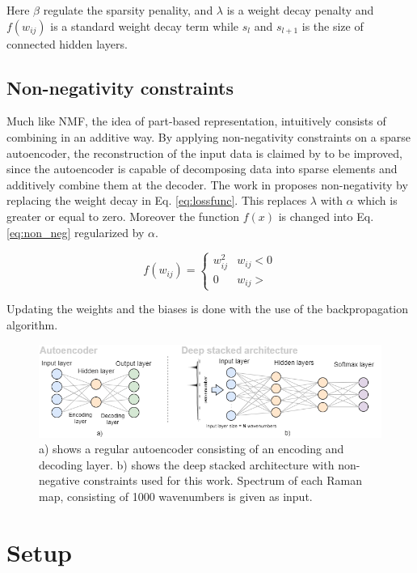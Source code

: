 \documentclass{article}
\begin{document}
Here $\beta$ regulate the sparsity penality, and $\lambda$ is a  weight decay penalty and $f(w_{ij})$ is a standard weight decay term while $s_l$ and $s_{l+1}$ is the size of connected hidden layers. 

\subsection{Non-negativity constraints}
\label{sec:prior}

Much like NMF, the idea of part-based representation, intuitively consists of combining in an additive way. By applying non-negativity constraints on a sparse autoencoder, the reconstruction of the input data is claimed by \cite{Hosseini-Asl2016} to be improved, since the autoencoder is capable of decomposing data into sparse elements and additively combine them at the decoder. The work in \cite{Hosseini-Asl2016} proposes non-negativity by replacing the weight decay in Eq. \eqref{eq:lossfunc}. This replaces $\lambda$ with $\alpha$ which is greater or equal to zero. Moreover the function $f(x)$ is changed into Eq. \eqref{eq:non_neg} regularized by $\alpha$. 

\begin{equation}
\label{eq:non_neg}
f(w_{ij}) = \begin{cases}
  w_{ij}^2 & w_{ij} < 0 \\
  0 & w_{ij} >
\end{cases} 
\end{equation}

Updating the weights and the biases is done with the use of the backpropagation algorithm. 

\begin{figure}[!h]
  \includegraphics[width=1\textwidth]{figures_4/setup_diagram.png}
  \caption{a) shows a regular autoencoder consisting of an encoding and decoding layer. b) shows the deep stacked architecture with non-negative constraints used for this work. Spectrum of each Raman map, consisting of 1000 wavenumbers is given as input. }\label{fig:setup}
\end{figure}

\section{Setup}
\label{sec:setup}
\end{document}
